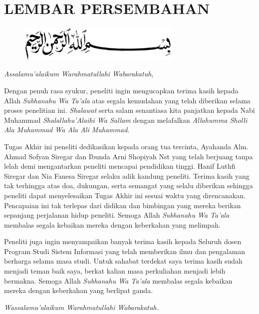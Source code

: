 %
%
%
%

\chapter*{LEMBAR PERSEMBAHAN}

\begin{figure}
	\centering
	\includegraphics[width=0.7\textwidth]{konten/gambar/bismillah.jpg}
\end{figure}

\textit{Assalamu’alaikum Warahmatullahi Wabarakatuh},

Dengan penuh rasa syukur, peneliti ingin mengucapkan terima kasih kepada Allah \textit{Subhanahu Wa Ta’ala} atas segala kemudahan yang telah diberikan selama proses penelitian ini. \textit{Shalawat} serta salam senantiasa kita panjatkan kepada Nabi Muhammad \textit{Shalallahu’Alaihi Wa Sallam} dengan melafalkan \textit{Allahumma Sholli Ala Muhammad Wa Ala Ali Muhammad}.

Tugas Akhir ini peneliti dedikasikan kepada orang tua tercinta, Ayahanda Alm. Ahmad Sofyan Siregar dan Ibunda Arni Shopiyah Nst yang telah berjuang tanpa lelah demi mengantarkan peneliti mencapai pendidikan tinggi. Hanif Luthfi Siregar dan Nia Fanesa Siregar selaku adik kandung peneliti. Terima kasih yang tak terhingga atas doa, dukungan, serta semangat yang selalu diberikan sehingga peneliti dapat menyelesaikan Tugas Akhir ini sesuai waktu yang direncanakan. Pencapaian ini tak terlepas dari didikan dan bimbingan yang mereka berikan sepanjang perjalanan hidup peneliti. Semoga Allah \textit{Subhanahu Wa Ta’ala} membalas segala kebaikan mereka dengan keberkahan yang melimpah.

Peneliti juga ingin menyampaikan banyak terima kasih kepada Seluruh dosen Program Studi Sistem Informasi yang telah memberikan ilmu dan pengalaman berharga selama masa studi. Untuk sahabat terdekat saya terima kasih sudah menjadi teman baik saya, berkat kalian masa perkuliahan menjadi lebih bermakna. Semoga Allah \textit{Subhanahu Wa Ta’ala} membalas segala kebaikan mereka dengan keberkahan yang berlipat ganda.

\textit{Wassalamu’alaikum Warahmatullahi Wabarakatuh.}